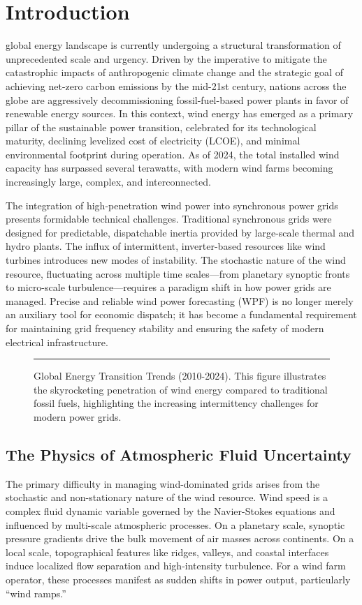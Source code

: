 \section{Introduction}
\label{sec:intro}
 global energy landscape is currently undergoing a structural transformation of unprecedented scale and urgency. Driven by the imperative to mitigate the catastrophic impacts of anthropogenic climate change and the strategic goal of achieving net-zero carbon emissions by the mid-21st century, nations across the globe are aggressively decommissioning fossil-fuel-based power plants in favor of renewable energy sources. In this context, wind energy has emerged as a primary pillar of the sustainable power transition, celebrated for its technological maturity, declining levelized cost of electricity (LCOE), and minimal environmental footprint during operation. As of 2024, the total installed wind capacity has surpassed several terawatts, with modern wind farms becoming increasingly large, complex, and interconnected.

The integration of high-penetration wind power into synchronous power grids presents formidable technical challenges. Traditional synchronous grids were designed for predictable, dispatchable inertia provided by large-scale thermal and hydro plants. The influx of intermittent, inverter-based resources like wind turbines introduces new modes of instability. The stochastic nature of the wind resource, fluctuating across multiple time scales---from planetary synoptic fronts to micro-scale turbulence---requires a paradigm shift in how power grids are managed. Precise and reliable wind power forecasting (WPF) is no longer merely an auxiliary tool for economic dispatch; it has become a fundamental requirement for maintaining grid frequency stability and ensuring the safety of modern electrical infrastructure.

\begin{figure}[htbp]
\centering
\rule{0.48\textwidth}{0.35\textwidth}
\caption{Global Energy Transition Trends (2010-2024). This figure illustrates the skyrocketing penetration of wind energy compared to traditional fossil fuels, highlighting the increasing intermittency challenges for modern power grids.}
\label{fig:energy_transition}
\end{figure}

\subsection{The Physics of Atmospheric Fluid Uncertainty}
\label{sec:physics}
The primary difficulty in managing wind-dominated grids arises from the stochastic and non-stationary nature of the wind resource. Wind speed is a complex fluid dynamic variable governed by the Navier-Stokes equations and influenced by multi-scale atmospheric processes. On a planetary scale, synoptic pressure gradients drive the bulk movement of air masses across continents. On a local scale, topographical features like ridges, valleys, and coastal interfaces induce localized flow separation and high-intensity turbulence. For a wind farm operator, these processes manifest as sudden shifts in power output, particularly ``wind ramps.''

